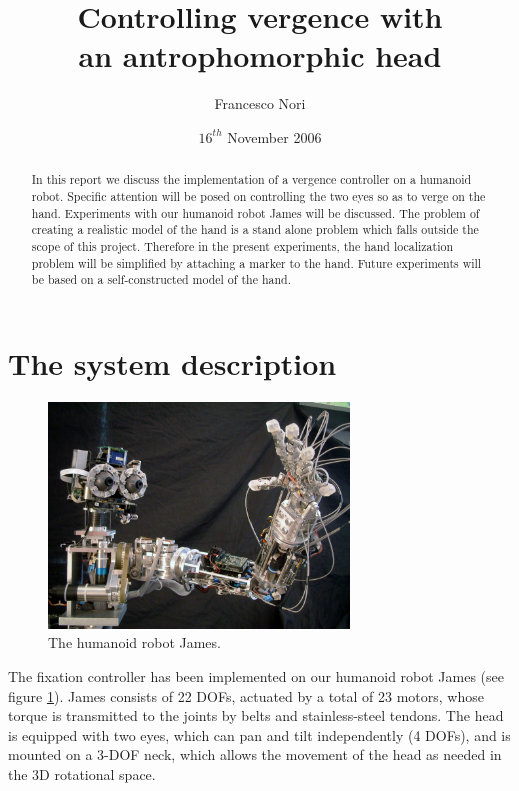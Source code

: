 \title {Controlling vergence with \\ an antrophomorphic head}
\author{Francesco Nori}
\date{$16^{th}$ November 2006}
\maketitle

\begin{abstract}
In this report we discuss the implementation of a vergence controller on a humanoid robot. Specific attention will be posed on controlling the two eyes so as to verge on the hand. Experiments with our humanoid robot James will be discussed. The problem of creating a realistic model of the hand is a stand alone problem which falls outside the scope of this project. Therefore in the present experiments, the hand localization problem will be simplified by attaching a marker to the hand. Future experiments will be based on a self-constructed model of the hand.
\end{abstract}

\section{The system description}

\begin{figure}[h!tbp]
\centering
\includegraphics[width=80mm]{Figure/James1.jpg}
\caption{The humanoid robot James.}
\label{Fig:PicureJames}
\end{figure}

The fixation controller has been implemented on our humanoid robot James (see figure \ref{Fig:PicureJames}). James consists of 22 DOFs, actuated by a total of 23 motors, whose torque is transmitted to the joints by belts and stainless-steel tendons. The head is equipped with two eyes, which can pan and tilt independently (4 DOFs), and is mounted on a 3-DOF neck, which allows the movement of the head as needed in the 3D rotational space.


